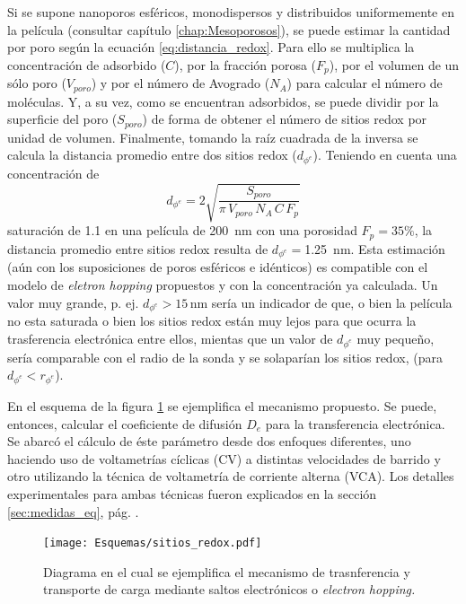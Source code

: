 	 	 Si se supone nanoporos esféricos, monodispersos y distribuidos uniformemente en la película (consultar capítulo \ref{chap:Mesoporosos}), se puede estimar la cantidad \ru\space por poro según la ecuación \ref{eq:distancia_redox}. Para ello se multiplica la concentración de \ru\space adsorbido ($C$), por la fracción porosa ($F_p$), por el volumen de un sólo poro ($V_{poro}$) y por el número de Avogrado ($N_{A}$) para calcular el número de moléculas. Y, a su vez, como se encuentran adsorbidos, se puede dividir por la superficie del poro ($S_{poro}$) de forma de obtener el número de sitios redox por unidad de volumen. Finalmente, tomando la raíz cuadrada de la inversa se calcula la distancia promedio entre dos sitios redox ($d_{\phi^{e}}$). Teniendo en cuenta una concentración de \linebreak
	 		\begin{equation}
					d_{\phi^{e}}=2\sqrt{\frac{S_{poro}}{\pi\, V_{poro}\, N_A\, C\, F_p}}
					\label{eq:distancia_redox}
			\end{equation}
	     saturación de \SI{1,1}{\Molar} en una película de \SI{200}{nm} con una porosidad $F_p=35\%$, la distancia promedio entre sitios redox resulta de $d_{\phi^{e}}=$\SI{1.25}{nm}. Esta estimación (aún con los suposiciones de poros esféricos e idénticos) es compatible con el modelo de \textit{eletron hopping} propuestos y con la concentración ya calculada. Un valor muy grande, p. ej. $d_{\phi^{e}}>15\, \text{nm}$ sería un indicador de que, o bien la película no esta saturada o bien los sitios redox están muy lejos para que ocurra la trasferencia electrónica entre ellos, mientas que un valor de $d_{\phi^{e}}$ muy pequeño, sería comparable con el radio de la sonda y se solaparían los sitios redox, (para $d_{\phi^{e}} < r_{\phi^{e}}$). 
	
	     En el esquema de la figura \ref{fig:sitios_redox} se ejemplifica el mecanismo propuesto. Se puede, entonces, calcular el coeficiente de difusión $D_e$ para la transferencia electrónica. Se abarcó el cálculo de éste parámetro desde dos enfoques diferentes, uno haciendo uso de voltametrías cíclicas (CV) a distintas velocidades de barrido y otro utilizando la técnica de voltametría de corriente alterna (VCA). Los detalles experimentales para ambas técnicas fueron explicados en la sección \ref{sec:medidas_eq}, pág. \pageref{sec:medidas_eq}.
			\begin{figure}[ht!]
					\centering
			 	    \texttt{[image: Esquemas/sitios\_redox.pdf]}
			        \caption[Mecanismo de transferencia de electrones]{Diagrama en el cual se ejemplifica el mecanismo de trasnferencia y transporte de carga mediante saltos electrónicos o \textit{electron hopping.}}
			        \label{fig:sitios_redox}
			      	\end{figure} 

